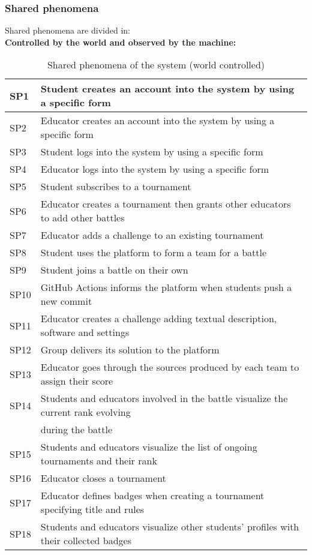 \subsubsection{Shared phenomena}
Shared phenomena are divided in:\\
\textbf{Controlled by the world and observed by the machine:}
\begin{table}[h]
    \centering
    \begin{tabular}{|l|l|}
        \hline
        SP1 & Student creates an account into the system by using a specific form \\
        \hline
        SP2 & Educator creates an account into the system by using a specific form \\
        \hline
        SP3 & Student logs into the system by using a specific form \\
        \hline
        SP4 & Educator logs into the system by using a specific form \\
        \hline
        SP5 & Student subscribes to a tournament \\
        \hline
        SP6 & Educator creates a tournament then grants other educators to add other battles \\
        \hline
        SP7 & Educator adds a challenge to an existing tournament \\
        \hline
        SP8 & Student uses the platform to form a team for a battle \\
        \hline
        SP9 & Student joins a battle on their own \\
        \hline
        SP10 & GitHub Actions informs the platform when students push a new commit \\
        \hline
        SP11 & Educator creates a challenge adding textual description, software and settings\\
        \hline
        SP12 & Group delivers its solution to the platform \\
        \hline
        SP13 & Educator goes through the sources produced by each team to assign their score \\
        \hline
        SP14 & Students and educators involved in the battle visualize the current rank evolving\\& during the battle \\
        \hline
        SP15 & Students and educators visualize the list of ongoing tournaments and their rank \\
        \hline
        SP16 & Educator closes a tournament \\
        \hline
        SP17 & Educator defines badges when creating a tournament specifying title and rules \\
        \hline
        SP18 & Students and educators visualize other students' profiles with their collected badges\\
        \hline
    \end{tabular}
    \caption{Shared phenomena of the system (world controlled)}
    \label{tab:goals}
\end{table}

